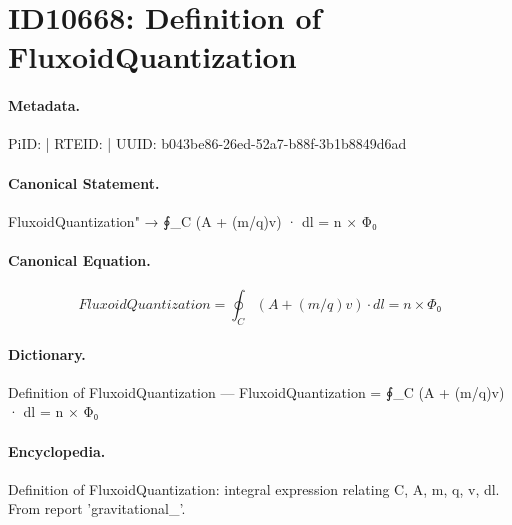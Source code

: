 \section*{ID10668: Definition of FluxoidQuantization}
\paragraph{Metadata.}
PiID:  | RTEID:  | UUID: b043be86-26ed-52a7-b88f-3b1b8849d6ad

\paragraph{Canonical Statement.}
FluxoidQuantization" → ∮\_C (A + (m/q)v) · dl = n × Φ₀

\paragraph{Canonical Equation.}
\[
FluxoidQuantization = ∮_C (A + (m/q)v) · dl = n × Φ₀
\]

\paragraph{Dictionary.}
Definition of FluxoidQuantization — FluxoidQuantization = ∮\_C (A + (m/q)v) · dl = n × Φ₀

\paragraph{Encyclopedia.}
Definition of FluxoidQuantization: integral expression relating C, A, m, q, v, dl. From report 'gravitational\_'.
